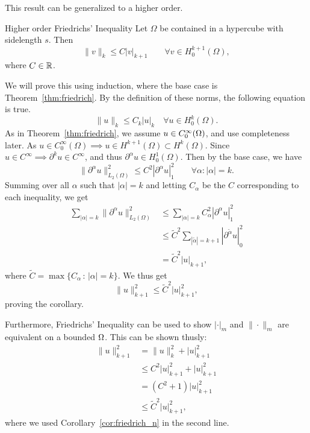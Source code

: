 This result can be generalized to a higher order. 

\begin{kor}{Higher order Friedrichs' Inequality}
    Let $\Omega$ be contained in a hypercube with sidelength $s$. Then 
\begin{equation*}
    \| v \|_{k} \leq C |v|_{k+1} \quad \quad \forall v \in H_0^{k+1}(\Omega),
\end{equation*}
where $C\in \mathbb{R}$.~\label{cor:friedrich_n}
\end{kor}
\begin{bev}
We will prove this using induction, where the base case is Theorem~\ref{thm:friedrich}.
By the definition of these norms, the following equation is true.
\begin{equation*}
    \|u\|_{k } \leq C_k |u|_k \quad \forall u \in H_0^k (\Omega). 
\end{equation*}
As in Theorem~\ref{thm:friedrich}, we assume $u \in C^\infty_0(\Omega)$, and use completeness later.
As $u\in C^{\infty}_0(\Omega)\implies u \in H^{k+1}(\Omega)\subset H^k(\Omega)$. 
Since $u \in C^{\infty} \implies \partial^k u\in C^{\infty}$, 
and thus $\partial^\alpha u \in H^1_0(\Omega)$. Then by the base case, we have
\begin{equation*}
    \|\partial^\alpha u\|^2_{L_2(\Omega)} \leq C^2 |\partial^\alpha u|_1^2 \quad\quad \forall \alpha : |\alpha|=k.
\end{equation*}
Summing over all $\alpha$ such that $|\alpha| = k$ and letting $C_\alpha$ be the $C$ corresponding to each inequality, we get
\begin{equation}
    \begin{split}
        \sum_{|\alpha|=k} \|\partial^\alpha u\|^2_{L_2(\Omega)} &\leq \sum_{|\alpha|=k} C_\alpha^2 |\partial^\alpha u|_1^2 \\
        &\leq  \tilde{C}^2 \sum_{|\tilde{\alpha}|=k+1} |\partial^{\tilde{\alpha}} u |^2_0 \\
        &= \tilde{C}^2 |u|_{k+1},
    \end{split}
\end{equation}  
where $\tilde{C} = \max\{C_\alpha \,:\, |\alpha| = k\}$.
We thus get
\begin{equation}
    \|u\|^2_{k+1} \leq \tilde{C}^2 |u|^2_{k+1},
\end{equation}
proving the corollary.
\end{bev}
Furthermore, Friedrichs' Inequality can be used to show $|\cdot|_m$ and $\| \cdot\|_m$ are equivalent on a bounded 
$\Omega$. 
This can be shown thusly:
\begin{align*}
    \|u\|^2_{k+1} &=\|u\|^2_{k} + |u|^2_{k+1} \\
    &\leq C^2|u|^2_{k+1} + |u|^2_{k+1} \\
    &= (C^2 + 1)|u|^2_{k+1} \\
    &\leq \tilde{C}^2 |u|^2_{k+1},
\end{align*}
where we used Corollary~\ref{cor:friedrich_n} in the second line.